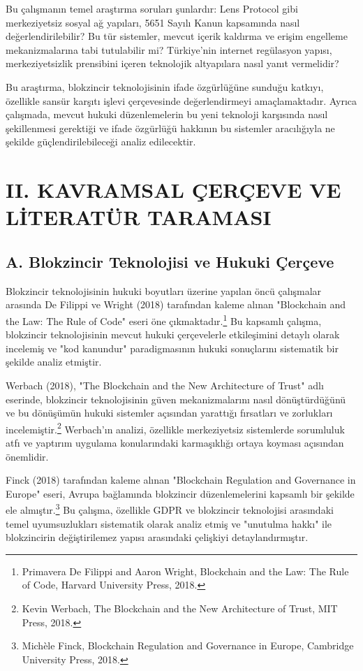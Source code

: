 \documentclass[11pt,a4paper]{article}
\begin{document}
Bu çalışmanın temel araştırma soruları şunlardır: Lens Protocol gibi merkeziyetsiz sosyal ağ yapıları, 5651 Sayılı Kanun kapsamında nasıl değerlendirilebilir? Bu tür sistemler, mevcut içerik kaldırma ve erişim engelleme mekanizmalarına tabi tutulabilir mi? Türkiye'nin internet regülasyon yapısı, merkeziyetsizlik prensibini içeren teknolojik altyapılara nasıl yanıt vermelidir?

Bu araştırma, blokzincir teknolojisinin ifade özgürlüğüne sunduğu katkıyı, özellikle sansür karşıtı işlevi çerçevesinde değerlendirmeyi amaçlamaktadır. Ayrıca çalışmada, mevcut hukuki düzenlemelerin bu yeni teknoloji karşısında nasıl şekillenmesi gerektiği ve ifade özgürlüğü hakkının bu sistemler aracılığıyla ne şekilde güçlendirilebileceği analiz edilecektir.

\section*{\fontsize{12}{14}\selectfont\bfseries II. KAVRAMSAL ÇERÇEVE VE LİTERATÜR TARAMASI}

\subsection*{\fontsize{12}{14}\selectfont\bfseries A. Blokzincir Teknolojisi ve Hukuki Çerçeve}

Blokzincir teknolojisinin hukuki boyutları üzerine yapılan öncü çalışmalar arasında De Filippi ve Wright (2018) tarafından kaleme alınan "Blockchain and the Law: The Rule of Code" eseri öne çıkmaktadır.\footnote{Primavera De Filippi and Aaron Wright, Blockchain and the Law: The Rule of Code, Harvard University Press, 2018.} Bu kapsamlı çalışma, blokzincir teknolojisinin mevcut hukuki çerçevelerle etkileşimini detaylı olarak incelemiş ve "kod kanundur" paradigmasının hukuki sonuçlarını sistematik bir şekilde analiz etmiştir.

Werbach (2018), "The Blockchain and the New Architecture of Trust" adlı eserinde, blokzincir teknolojisinin güven mekanizmalarını nasıl dönüştürdüğünü ve bu dönüşümün hukuki sistemler açısından yarattığı fırsatları ve zorlukları incelemiştir.\footnote{Kevin Werbach, The Blockchain and the New Architecture of Trust, MIT Press, 2018.} Werbach'ın analizi, özellikle merkeziyetsiz sistemlerde sorumluluk atfı ve yaptırım uygulama konularındaki karmaşıklığı ortaya koyması açısından önemlidir.

Finck (2018) tarafından kaleme alınan "Blockchain Regulation and Governance in Europe" eseri, Avrupa bağlamında blokzincir düzenlemelerini kapsamlı bir şekilde ele almıştır.\footnote{Michèle Finck, Blockchain Regulation and Governance in Europe, Cambridge University Press, 2018.} Bu çalışma, özellikle GDPR ve blokzincir teknolojisi arasındaki temel uyumsuzlukları sistematik olarak analiz etmiş ve "unutulma hakkı" ile blokzincirin değiştirilemez yapısı arasındaki çelişkiyi detaylandırmıştır.
\end{document}
